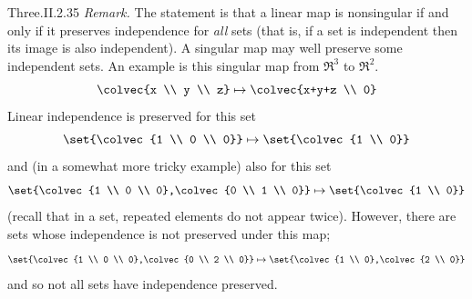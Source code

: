 \begin{ans}{Three.II.2.35}
      \textit{Remark.}
      The statement is that a linear map is nonsingular if and only if it
      preserves independence for \emph{all} sets
      (that is, if a set is independent then its image is also independent).
      A singular map may well preserve some independent sets.
      An example is this singular map from $\Re^3$ to $\Re^2$.
      \begin{equation*}
        \colvec{x \\ y \\ z}\mapsto\colvec{x+y+z \\ 0}
      \end{equation*}
      Linear independence is preserved for this set
      \begin{equation*}
        \set{\colvec{1 \\ 0 \\ 0}}\mapsto\set{\colvec{1 \\ 0}}
      \end{equation*}
      and (in a somewhat more tricky example) also for this set
      \begin{equation*}
        \set{\colvec{1 \\ 0 \\ 0},\colvec{0 \\ 1 \\ 0}}
        \mapsto\set{\colvec{1 \\ 0}}
      \end{equation*}
      (recall that in a set, repeated elements do not appear twice).
      However, there are sets whose independence is not preserved under this
      map;
      \begin{equation*}
        \set{\colvec{1 \\ 0 \\ 0},\colvec{0 \\ 2 \\ 0}}
        \mapsto\set{\colvec{1 \\ 0},\colvec{2 \\ 0}}
      \end{equation*}
      and so not all sets have independence preserved.
    
\end{ans}
